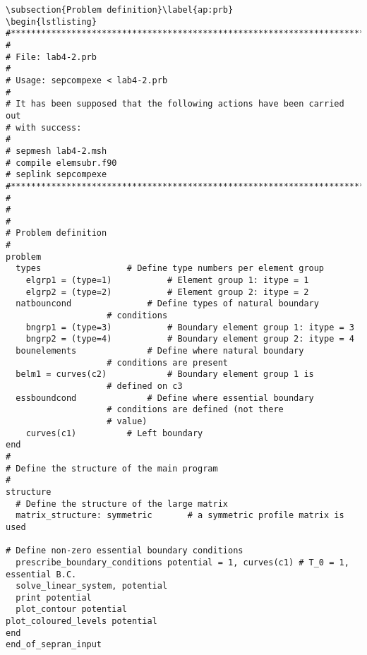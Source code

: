 \begin{lstlisting}
\subsection{Problem definition}\label{ap:prb}
\begin{lstlisting}
#*****************************************************************************
#
# File: lab4-2.prb
#
# Usage: sepcompexe < lab4-2.prb
#
# It has been supposed that the following actions have been carried out
# with success:
#
# sepmesh lab4-2.msh
# compile elemsubr.f90
# seplink sepcompexe
#*****************************************************************************
#
#
#
# Problem definition
#
problem
  types					# Define type numbers per element group
    elgrp1 = (type=1)			# Element group 1: itype = 1
    elgrp2 = (type=2)			# Element group 2: itype = 2
  natbouncond				# Define types of natural boundary
					# conditions
    bngrp1 = (type=3)			# Boundary element group 1: itype = 3
    bngrp2 = (type=4)			# Boundary element group 2: itype = 4
  bounelements				# Define where natural boundary
					# conditions are present
  belm1 = curves(c2)			# Boundary element group 1 is
					# defined on c3
  essboundcond				# Define where essential boundary
					# conditions are defined (not there
					# value)
	curves(c1)			# Left boundary	
end
#
# Define the structure of the main program
#
structure
  # Define the structure of the large matrix
  matrix_structure: symmetric 		# a symmetric profile matrix is used
  
# Define non-zero essential boundary conditions
  prescribe_boundary_conditions potential = 1, curves(c1) # T_0 = 1, essential B.C.
  solve_linear_system, potential
  print potential
  plot_contour potential
plot_coloured_levels potential
end
end_of_sepran_input

\end{lstlisting}